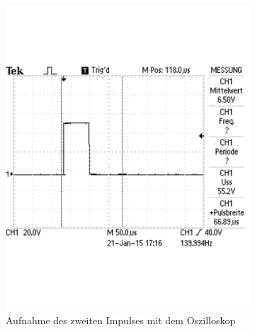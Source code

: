 \documentclass[12pt,a4paper]{article}
\begin{document}
\begin{figure}[H]
\centering
\begin{subfigure}[b]{0.45\textwidth}
\centering
\includegraphics[scale=0.4]{3_1_67.pdf}
\caption[Aufnahme des 2. Impulses mit dem Oszilloskop]{Aufnahme des zweiten Impulses mit dem Oszilloskop}
\end{subfigure}
\hfill
\begin{subfigure}[b]{0.45\textwidth}
\centering

\end{subfigure}
\end{figure}
\end{document}
